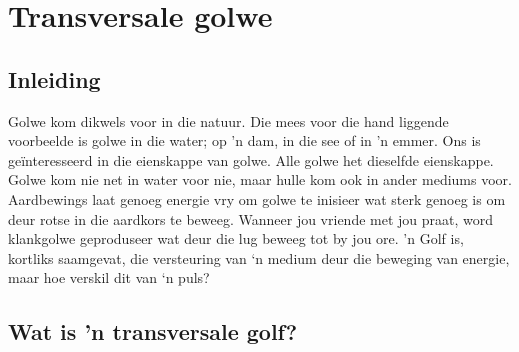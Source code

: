          \chapter{Transversale golwe}
    \setcounter{figure}{1}
    \setcounter{subfigure}{1}
    \label{m38806}
    \section{Inleiding}
            \nopagebreak
      \label{m38806*id317331}Golwe kom dikwels voor in die natuur. Die mees voor die hand liggende voorbeelde is golwe in die water; op 'n dam, in die see of in 'n emmer. Ons is geïnteresseerd in die eienskappe van golwe. Alle golwe het dieselfde eienskappe.
Golwe kom nie net in water voor nie, maar hulle kom ook in ander mediums voor. Aardbewings laat genoeg energie vry om golwe te inisieer wat sterk genoeg is om deur rotse in die aardkors te beweeg. Wanneer jou vriende met jou praat, word klankgolwe geproduseer wat deur die lug beweeg tot by jou ore. 'n Golf is, kortliks saamgevat, die versteuring van ‘n medium deur die beweging van energie, maar hoe verskil dit van ‘n puls?

    \section{Wat is 'n transversale golf?}

